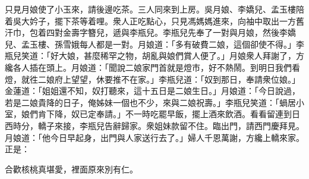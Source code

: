 只見月娘使了小玉來，請後邊吃茶。三人同來到上房。吳月娘、李嬌兒、孟玉樓陪着吳大妗子，擺下茶等着哩。衆人正吃點心，只見馮媽媽進來，向袖中取出一方舊汗巾，包着四對金壽字簪兒，遞與李瓶兒。李瓶兒先奉了一對與月娘，然後李嬌兒、孟玉樓、孫雪娥每人都是一對。月娘道：「多有破費二娘，這個卻使不得。」李瓶兒笑道：「好大娘，甚麼稀罕之物，胡亂與娘們賞人便了。」月娘衆人拜謝了，方纔各人插在頭上。月娘道：「聞說二娘家門首就是燈市，好不熱鬧。到明日我們看燈，就徃二娘府上望望，休要推不在家。」李瓶兒道：「奴到那日，奉請衆位娘。」金蓮道：「姐姐還不知，奴打聽來，這十五日是二娘生日。」月娘道：「今日說過，若是二娘貴降的日子，俺姊妹一個也不少，來與二娘祝壽。」李瓶兒笑道：「蝸居小室，娘們肯下降，奴已定奉請。」不一時吃罷早飯，擺上酒來飲酒。看看留連到日西時分，轎子來接，李瓶兒告辭歸家。衆姐妹款留不住。臨出門，請西門慶拜見。月娘道：「他今日早起身，出門與人家送行去了。」婦人千恩萬謝，方纔上轎來家。正是：

合歡核桃真堪愛，裡面原來別有仁。

